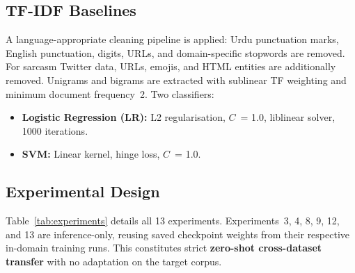 \documentclass[conference]{IEEEtran}
\begin{document}
\subsection{TF-IDF Baselines}

A language-appropriate cleaning pipeline is applied: Urdu punctuation
marks, English punctuation, digits, URLs, and domain-specific
stopwords are removed. For sarcasm Twitter data, URLs, emojis, and
HTML entities are additionally removed. Unigrams and bigrams are
extracted with sublinear TF weighting and minimum document frequency~2.
Two classifiers:
\begin{itemize}
    \item \textbf{Logistic Regression (LR):} L2 regularisation,
    $C$~= 1.0, liblinear solver, 1000 iterations.
    \item \textbf{SVM:} Linear kernel, hinge loss, $C$~= 1.0.
\end{itemize}

\subsection{Experimental Design}
\label{sec:expdesign}

Table~\ref{tab:experiments} details all 13 experiments.
Experiments~3, 4, 8, 9, 12, and 13 are inference-only, reusing
saved checkpoint weights from their respective in-domain training
runs. This constitutes strict \textbf{zero-shot cross-dataset
transfer} with no adaptation on the target corpus.
\end{document}
